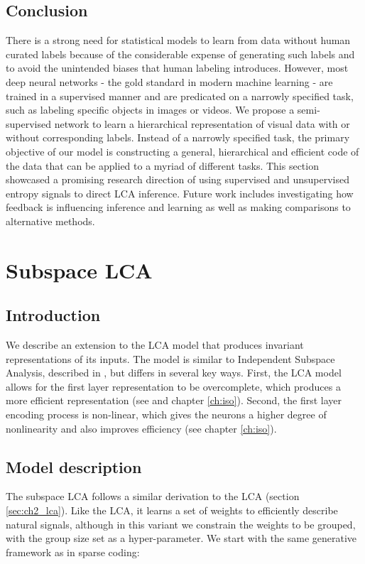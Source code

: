 \subsection{Conclusion}
There is a strong need for statistical models to learn from data without human curated labels because of the considerable expense of generating such labels and to avoid the unintended biases that human labeling introduces. However, most deep neural networks - the gold standard in modern machine learning - are trained in a supervised manner and are predicated on a narrowly specified task, such as labeling specific objects in images or videos. We propose a semi-supervised network to learn a hierarchical representation of visual data with or without corresponding labels. Instead of a narrowly specified task, the primary objective of our model is constructing a general, hierarchical and efficient code of the data that can be applied to a myriad of different tasks. This section showcased a promising research direction of using supervised and unsupervised entropy signals to direct LCA inference. Future work includes investigating how feedback is influencing inference and learning as well as making comparisons to alternative methods.


\section{Subspace LCA}\label{sec:ch3_subspace_lca}
\subsection{Introduction}
We describe an extension to the LCA model that produces invariant representations of its inputs. The model is similar to Independent Subspace Analysis, described in \parencite{hyvarinen2000emergence}, but differs in several key ways. First, the LCA model allows for the first layer representation to be overcomplete, which produces a more efficient representation (see \parencite{lewicki2000learning} and chapter \ref{ch:iso}). Second, the first layer encoding process is non-linear, which gives the neurons a higher degree of nonlinearity and also improves efficiency (see chapter \ref{ch:iso}).

\subsection{Model description}
The subspace LCA follows a similar derivation to the LCA (section \ref{sec:ch2_lca}). Like the LCA, it learns a set of weights to efficiently describe natural signals, although in this variant we constrain the weights to be grouped, with the group size set as a hyper-parameter. We start with the same generative framework as in sparse coding:

